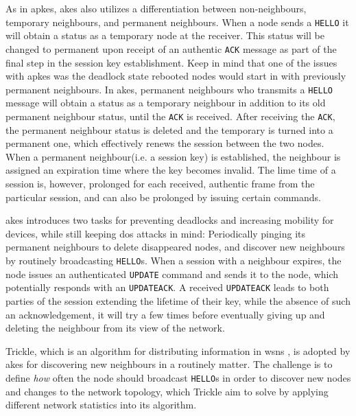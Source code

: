 As in \gls{apkes}, \gls{akes} also utilizes a differentiation between non-neighbours, temporary neighbours, and permanent neighbours. When a node sends a \texttt{HELLO} it will obtain a status as a temporary node at the receiver. This status will be changed to permanent upon receipt of an authentic \texttt{ACK} message as part of the final step in the session key establishment. Keep in mind that one of the issues with \gls{apkes} was the deadlock state rebooted nodes would start in with previously permanent neighbours. In \gls{akes}, permanent neighbours who transmits a \texttt{HELLO} message will obtain a status as a temporary neighbour in addition to its old permanent neighbour status, until the \texttt{ACK} is received. After receiving the \texttt{ACK}, the permanent neighbour status is deleted and the temporary is turned into a permanent one, which effectively renews the session between the two nodes. When a permanent neighbour(i.e. a session key) is established, the neighbour is assigned an expiration time where the key becomes invalid. The lime time of a session is, however, prolonged for each received, authentic frame from the particular session, and can also be prolonged by issuing certain commands. 

\gls{akes} introduces two tasks for preventing deadlocks and increasing mobility for devices, while still keeping \gls{dos} attacks in mind: Periodically pinging its permanent neighbours to delete disappeared nodes, and discover new neighbours by routinely broadcasting \texttt{HELLO}s. When a session with a neighbour expires, the node issues an authenticated \texttt{UPDATE} command and sends it to the node, which potentially responds with an \texttt{UPDATEACK}. A received \texttt{UPDATEACK} leads to both parties of the session extending the lifetime of their key, while the absence of such an acknowledgement, it will try a few times before eventually giving up and deleting the neighbour from its view of the network.

Trickle, which is an algorithm for distributing information in \gls{wsn}s \cite{levis2011trickle}, is adopted by \gls{akes} for discovering new neighbours in a routinely matter. The challenge is to define \emph{how} often the node should broadcast \texttt{HELLO}s in order to discover new nodes and changes to the network topology, which Trickle aim to solve by applying different network statistics into its algorithm.

